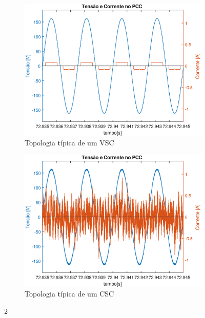 \begin{figure}[!htb] %
	\centering
	\begin{subfigure}[b]{0.48\textwidth}
		\centering
		\includegraphics[width=\textwidth]{Cap4/Figuras/resultados_unfilt_2.eps}
		\caption{Topologia típica de um VSC} 
		\label{fig:resultados_unfilt_2.eps}
	\end{subfigure}%
		\hfill
	\begin{subfigure}[b]{0.48\textwidth}  
		\centering 
		\includegraphics[width=\textwidth]{Cap4/Figuras/resultados_filt_2.eps}
		\caption{Topologia típica de um CSC}    
		\label{fig:resultados_filt_2.eps}
	\end{subfigure}%
	\caption{2}
	\label{fig:2}
\end{figure}

